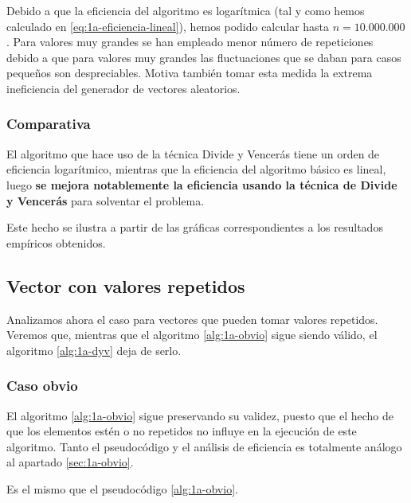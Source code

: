 Debido a que la eficiencia del algoritmo es logarítmica (tal y como hemos calculado en \ref{eq:1a-eficiencia-lineal}),
hemos podido calcular hasta $n = 10.000.000$. Para valores muy grandes se han empleado menor número de repeticiones
debido a que para valores muy grandes las fluctuaciones que se daban para casos pequeños son despreciables. 
Motiva también tomar esta medida la extrema ineficiencia del generador de vectores aleatorios. 


\subsubsection{Comparativa}

El algoritmo que hace uso de la técnica Divide y Vencerás tiene un orden de eficiencia logarítmico, mientras
que la eficiencia del algoritmo básico es lineal, luego \textbf{se mejora notablemente la eficiencia usando la técnica de 
Divide y Vencerás} para solventar el problema. 

Este hecho se ilustra a partir de las gráficas correspondientes a los resultados empíricos obtenidos.   %


\subsection{Vector con valores repetidos}

Analizamos ahora el caso para vectores que pueden tomar valores repetidos. Veremos que, mientras que el algoritmo
\ref{alg:1a-obvio} sigue siendo válido, el algoritmo \ref{alg:1a-dyv} deja de serlo. 

\subsubsection{Caso obvio}

El algoritmo \ref{alg:1a-obvio} sigue preservando su validez, puesto que el hecho de que los elementos estén o no
repetidos no influye en la ejecución de este algoritmo. Tanto el pseudocódigo y el análisis de eficiencia es totalmente
análogo al apartado \ref{sec:1a-obvio}. 


Es el mismo que el pseudocódigo \ref{alg:1a-obvio}. 


